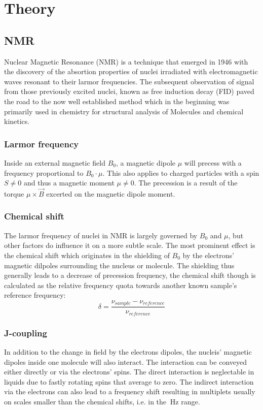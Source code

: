\chapter{Theory}\label{chap:theory}
	\section{NMR}
		Nuclear Magnetic Resonance (NMR) is a technique that emerged in 1946 with the discovery
		of the absortion properties of nuclei irradiated with electromagnetic waves resonant to their
		larmor frequencies.\cite{ResonanceAbsorption} The subsequent observation of signal from those
		previously excited nuclei, known as free induction decay (FID) paved the road to the now well
		established method which in the beginning was primarily used in chemistry for structural
		analysis of Molecules and chemical kinetics.
		\subsection{Larmor frequency}
			Inside an external magnetic field $B_0$, a magnetic dipole $\mu$ will precess with a frequency
			proportional to $B_0\cdot \mu$. This also applies to charged particles with a spin $S\neq0$ and thus
			a magnetic moment $\mu\neq0$. The precession is a result of the torque $\mu\times\vec B$
			excerted on the magnetic dipole moment.
		\subsection{Chemical shift}
			The larmor frequency of nuclei in NMR is largely governed by $B_0$ and $\mu$, but other factors do
			influence it on a more subtle scale. The most prominent effect is the chemical shift which
			originates in the shielding of $B_0$ by the electrons' magnetic dilpoles surrounding the nucleus or molecule.
			The shielding thus generally leads to a decrease of precession frequency, the chemical shift
			though is calculated as the relative frequency quota towards another known sample's
			reference frequency:
			\begin{equation}
				\delta = \frac{\nu_{sample} - \nu_{reference}}{\nu_{reference}}
			\end{equation}
		\subsection{J-coupling}
			In addition to the change in field by the electrons dipoles, the nucleis' magnetic
			dipoles inside one molecule will also interact. The interaction can be conveyed either
			directly or via the electrons' spins. The direct interaction is neglectable in liquids
			due to fastly rotating spins that average to zero. The indirect interaction via the
			electrons can also lead to a frequency shift resulting in multiplets usually on scales
			smaller than the chemical shifts, i.e. in the $\SI{}{\hertz}$ range.

